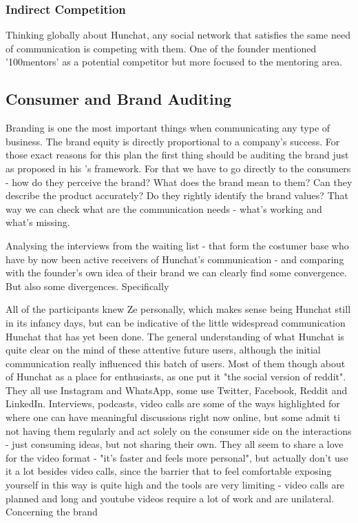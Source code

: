 \documentclass[12pt]{article}
\begin{document}
	\subsubsection{Indirect Competition}
	Thinking globally about Hunchat, any social network that satisfies the same need of communication is competing with them. One of the founder mentioned '100mentors' as a potential competitor but more focused to the mentoring area.
	

	
\subsection{Consumer and Brand Auditing}
Branding is one the most important things when communicating any type of business. The brand equity is directly proportional to a company's success. For those exact reasons for this plan the first thing should be auditing the brand just as \citeauthor{kliatchko} proposed in his \citeyear{kliatchko}'s framework. For that we have to go directly to the consumers - how do they perceive the brand? What does the brand mean to them? Can they describe the product accurately? Do they rightly identify the brand values? That way we can check what are the communication needs - what's working and what's missing.

Analysing the interviews from the waiting list - that form the costumer base who have by now been active receivers of Hunchat's communication - and comparing with the founder's own idea of their brand we can clearly find some convergence. %
But also some divergences. Specifically

All of the participants knew Ze personally, which makes sense being Hunchat still in its infancy days, but can be indicative of the little widespread communication Hunchat that has yet been done. The general understanding of what Hunchat is quite clear on the mind of these attentive future users, although the initial communication really influenced this batch of users. Most of them though about of Hunchat as a place for enthusiasts, as one put it "the social version of reddit". They all use Instagram and WhatsApp, some use Twitter, Facebook, Reddit and LinkedIn.  Interviews, podcasts, video calls are some of the ways highlighted for where one can have meaningful discussions right now online, but some admit ti not having them regularly and act solely on the consumer side on the interactions - just consuming ideas, but not sharing their own. They all seem to share a love for the video format - "it's faster and feels more personal", but actually don't use it a lot besides video calls, since the barrier that  to feel comfortable exposing yourself in this way is quite high and the tools are very limiting - video calls are planned and long and youtube videos require a lot of work and are unilateral. Concerning the brand 
\end{document}
